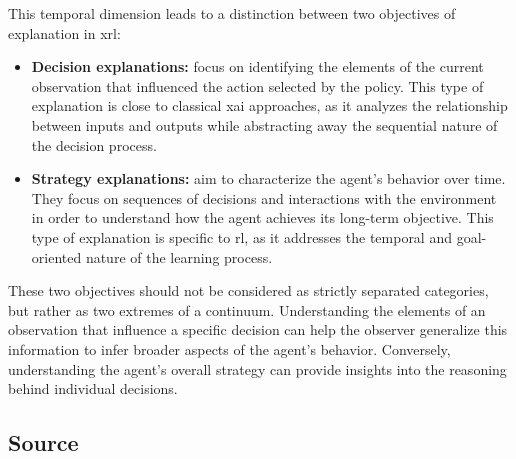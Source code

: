 This temporal dimension leads to a distinction between two objectives of explanation in \gls{xrl}:
\begin{itemize}
    \item \textbf{Decision explanations:} focus on identifying the elements of the current observation that influenced the action selected by the policy.
    This type of explanation is close to classical \gls{xai} approaches, as it analyzes the relationship between inputs and outputs while abstracting away the sequential nature of the decision process.

    \item \textbf{Strategy explanations:} aim to characterize the agent's behavior over time.
    They focus on sequences of decisions and interactions with the environment in order to understand how the agent achieves its long-term objective.
    This type of explanation is specific to \gls{rl}, as it addresses the temporal and goal-oriented nature of the learning process.
\end{itemize}

These two objectives should not be considered as strictly separated categories, but rather as two extremes of a continuum.
Understanding the elements of an observation that influence a specific decision can help the observer generalize this information to infer broader aspects of the agent's behavior.
Conversely, understanding the agent's overall strategy can provide insights into the reasoning behind individual decisions.

\subsection{Source}
\label{subsec:source}

